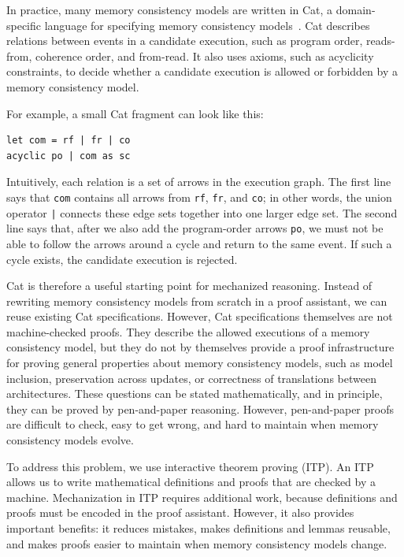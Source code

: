 In practice, many memory consistency models are written in Cat, a domain-specific language for specifying memory consistency models~\cite{10.1145/2627752,catOnlineDocHerd,catManualSyntax11}. Cat describes relations between events in a candidate execution, such as program order, reads-from, coherence order, and from-read. It also uses axioms, such as acyclicity constraints, to decide whether a candidate execution is allowed or forbidden by a memory consistency model.

For example, a small Cat fragment can look like this:

\begin{lstlisting}
let com = rf | fr | co
acyclic po | com as sc
\end{lstlisting}

Intuitively, each relation is a set of arrows in the execution graph. The first line says that \texttt{com} contains all arrows from \texttt{rf}, \texttt{fr}, and \texttt{co}; in other words, the union operator \texttt{|} connects these edge sets together into one larger edge set. The second line says that, after we also add the program-order arrows \texttt{po}, we must not be able to follow the arrows around a cycle and return to the same event. If such a cycle exists, the candidate execution is rejected.

Cat is therefore a useful starting point for mechanized reasoning. Instead of rewriting memory consistency models from scratch in a proof assistant, we can reuse existing Cat specifications. However, Cat specifications themselves are not machine-checked proofs. They describe the allowed executions of a memory consistency model, but they do not by themselves provide a proof infrastructure for proving general properties about memory consistency models, such as model inclusion, preservation across updates, or correctness of translations between architectures. These questions can be stated mathematically, and in principle, they can be proved by pen-and-paper reasoning. However, pen-and-paper proofs are difficult to check, easy to get wrong, and hard to maintain when memory consistency models evolve.

To address this problem, we use interactive theorem proving (ITP). An ITP allows us to write mathematical definitions and proofs that are checked by a machine. Mechanization in ITP requires additional work, because definitions and proofs must be encoded in the proof assistant. However, it also provides important benefits: it reduces mistakes, makes definitions and lemmas reusable, and makes proofs easier to maintain when memory consistency models change.


